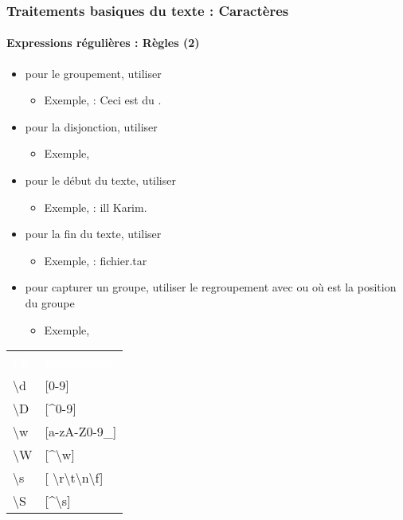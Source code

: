 \documentclass[xcolor=table]{beamer}
\begin{document}
\begin{frame}
\frametitle{Traitements basiques du texte : Caractères}
\framesubtitle{Expressions régulières : Règles (2)}

\begin{minipage}{.6\textwidth}
\begin{itemize}
	\item pour le groupement, utiliser \keyword{( )}
	\begin{itemize}
		\item Exemple,  : Ceci est du .
	\end{itemize}
	\item pour la disjonction, utiliser \keyword{\textbar}
	\begin{itemize}
		\item Exemple, 
	\end{itemize}
	\item pour le début du texte, utiliser \keyword{\textasciicircum}
	\begin{itemize}
		\item Exemple,  :  ill Karim.
	\end{itemize}
	\item pour la fin du texte, utiliser \keyword{\$}
	\begin{itemize}
		\item Exemple,  :  fichier.tar
	\end{itemize}
	\item pour capturer un groupe, utiliser le regroupement avec  ou  où  est la position du groupe
	\begin{itemize}
		\item Exemple, 
	\end{itemize}
\end{itemize}
\end{minipage}
\begin{minipage}{.38\textwidth}
\begin{tabular}{p{}p{}}
	\rowcolor{darkblue}
	\textcolor{white}{ER} & \textcolor{white}{Équivalence} \\
	
	\textbackslash d & [0-9] \\
	\textbackslash D & [\textasciicircum 0-9] \\
	\textbackslash w & [a-zA-Z0-9\_] \\
	\textbackslash W & [\textasciicircum \textbackslash w] \\
	\textbackslash s & [ \textbackslash r\textbackslash t\textbackslash n\textbackslash f] \\
	\textbackslash S & [\textasciicircum \textbackslash s] \\
\end{tabular}

\end{minipage}

\end{frame}
\end{document}
